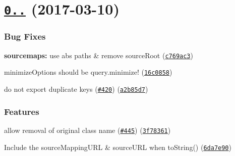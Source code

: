  \section*{\href{https://github.com/webpack/css-loader/compare/v0.26.2...v0.27.0}{\tt 0..} (2017-\/03-\/10)}

\subsubsection*{Bug Fixes}


\begin{DoxyItemize}
\item {\bfseries sourcemaps\+:} use abs paths \& remove source\+Root (\href{https://github.com/webpack/css-loader/commit/c769ac3}{\tt c769ac3})
\item {\ttfamily minimize\+Options} should be {\ttfamily query.\+minimize}! (\href{https://github.com/webpack/css-loader/commit/16c0858}{\tt 16c0858})
\item do not export duplicate keys (\href{https://github.com/webpack/css-loader/issues/420}{\tt \#420}) (\href{https://github.com/webpack/css-loader/commit/a2b85d7}{\tt a2b85d7})
\end{DoxyItemize}

\subsubsection*{Features}


\begin{DoxyItemize}
\item allow removal of original class name (\href{https://github.com/webpack/css-loader/issues/445}{\tt \#445}) (\href{https://github.com/webpack/css-loader/commit/3f78361}{\tt 3f78361})
\item Include the source\+Mapping\+U\+RL \& source\+U\+RL when to\+String() (\href{https://github.com/webpack/css-loader/commit/6da7e90}{\tt 6da7e90}) 
\end{DoxyItemize}